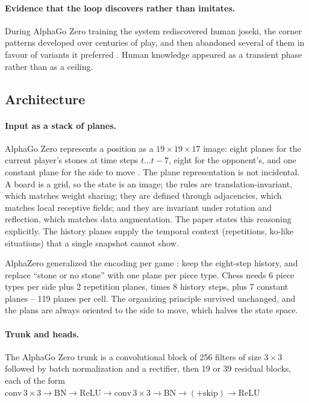 \paragraph{Evidence that the loop discovers rather than imitates.} During AlphaGo
Zero training the system rediscovered human joseki, the corner patterns developed
over centuries of play, and then abandoned several of them in favour of variants
it preferred \citep{silver2017alphagozero}. Human knowledge appeared as a
transient phase rather than as a ceiling.

\subsection{Architecture}
\label{sec:architecture}

\paragraph{Input as a stack of planes.} AlphaGo Zero represents a position as a
$19\times19\times17$ image: eight planes for the current player's stones at time
steps $t \dots t-7$, eight for the opponent's, and one constant plane for the
side to move \citep{silver2017alphagozero}. The plane representation is not
incidental. A board is a grid, so the state is an image; the rules are
translation-invariant, which matches weight sharing; they are defined through
adjacencies, which matches local receptive fields; and they are invariant under
rotation and reflection, which matches data augmentation. The paper states this
reasoning explicitly. The history planes supply the temporal context
(repetitions, ko-like situations) that a single snapshot cannot show.

AlphaZero generalized the encoding per game \citep{silver2018alphazero}: keep the
eight-step history, and replace ``stone or no stone'' with one plane per piece
type. Chess needs 6 piece types per side plus 2 repetition planes, times 8
history steps, plus 7 constant planes -- 119 planes per cell. The organizing
principle survived unchanged, and the plans are always oriented to the side to
move, which halves the state space.

\paragraph{Trunk and heads.} The AlphaGo Zero trunk is a convolutional block of
256 filters of size $3\times3$ followed by batch normalization and a rectifier,
then 19 or 39 residual blocks, each of the form
$\mathrm{conv}\,3{\times}3 \to \mathrm{BN} \to \mathrm{ReLU} \to
\mathrm{conv}\,3{\times}3 \to \mathrm{BN} \to (+ \mathrm{skip}) \to \mathrm{ReLU}$

